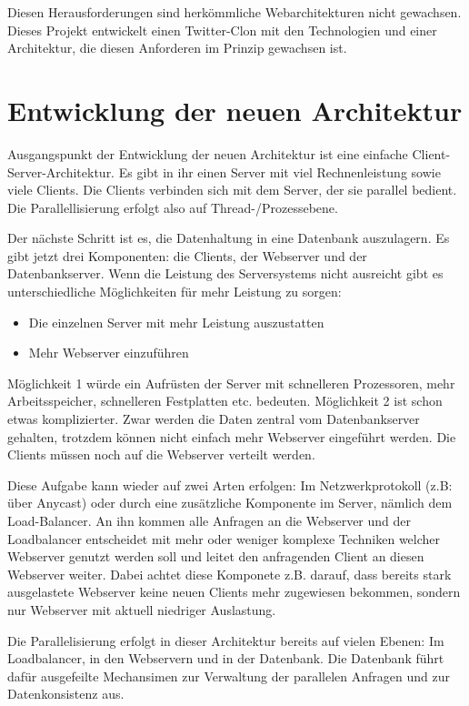Diesen Herausforderungen sind herkömmliche Webarchitekturen nicht gewachsen. Dieses Projekt entwickelt einen Twitter-Clon
mit den Technologien und einer Architektur, die diesen Anforderen im Prinzip gewachsen ist.

\section{Entwicklung der neuen Architektur}
Ausgangspunkt der Entwicklung der neuen Architektur ist eine einfache Client-Server-Architektur. Es gibt in ihr einen Server
mit viel Rechnenleistung sowie viele Clients. Die Clients verbinden sich mit dem Server, der sie parallel bedient. Die Parallellisierung
erfolgt also auf Thread-/Prozessebene.

Der nächste Schritt ist es, die Datenhaltung in eine Datenbank auszulagern. Es gibt jetzt drei Komponenten: die Clients,
der Webserver und der Datenbankserver. Wenn die Leistung des Serversystems nicht ausreicht gibt es unterschiedliche Möglichkeiten
für mehr Leistung zu sorgen:
\begin{itemize}
  \item Die einzelnen Server mit mehr Leistung auszustatten
  \item Mehr Webserver einzuführen
\end{itemize}
Möglichkeit 1 würde ein Aufrüsten der Server mit schnelleren Prozessoren, mehr Arbeitsspeicher, schnelleren Festplatten etc.
bedeuten. Möglichkeit 2 ist schon etwas komplizierter. Zwar werden die Daten zentral vom Datenbankserver gehalten,
trotzdem können nicht einfach mehr Webserver eingeführt werden. Die Clients müssen noch auf die Webserver verteilt werden.

Diese Aufgabe kann wieder auf zwei Arten erfolgen: Im Netzwerkprotokoll (z.B: über Anycast) oder durch eine zusätzliche
Komponente im Server, nämlich dem Load-Balancer. An ihn kommen alle Anfragen an die Webserver und der Loadbalancer
entscheidet mit mehr oder weniger komplexe Techniken welcher Webserver genutzt werden soll und leitet
den anfragenden Client an diesen Webserver weiter. Dabei achtet diese Komponete z.B. darauf, dass bereits stark
ausgelastete Webserver keine neuen Clients mehr zugewiesen bekommen, sondern nur Webserver mit aktuell
niedriger Auslastung.

Die Parallelisierung erfolgt in dieser Architektur bereits auf vielen Ebenen: Im Loadbalancer, in den Webservern und in der
Datenbank. Die Datenbank führt dafür ausgefeilte Mechansimen zur Verwaltung der parallelen Anfragen und zur
Datenkonsistenz aus.

